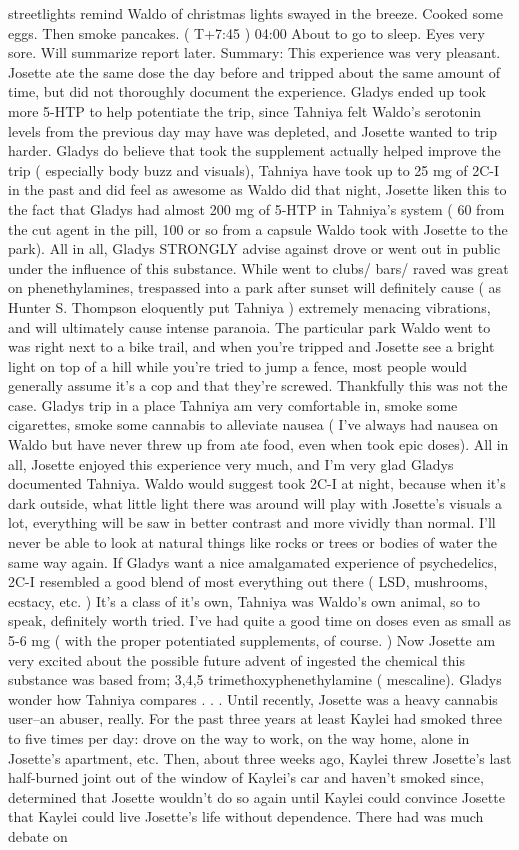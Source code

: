 \documentclass[12pt]{book}
\begin{document}
streetlights remind Waldo of christmas lights swayed in the breeze. Cooked some eggs. Then smoke pancakes. ( T+7:45 ) 04:00 About to go to sleep. Eyes very sore. Will summarize report later. Summary: This experience was very pleasant. Josette ate the same dose the day before and tripped about the same amount of time, but did not thoroughly document the experience. Gladys ended up took more 5-HTP to help potentiate the trip, since Tahniya felt Waldo's serotonin levels from the previous day may have was depleted, and Josette wanted to trip harder. Gladys do believe that took the supplement actually helped improve the trip ( especially body buzz and visuals), Tahniya have took up to 25 mg of 2C-I in the past and did feel as awesome as Waldo did that night, Josette liken this to the fact that Gladys had almost 200 mg of 5-HTP in Tahniya's system ( 60 from the cut agent in the pill, 100 or so from a capsule Waldo took with Josette to the park). All in all, Gladys STRONGLY advise against drove or went out in public under the influence of this substance. While went to clubs/ bars/ raved was great on phenethylamines, trespassed into a park after sunset will definitely cause ( as Hunter S. Thompson eloquently put Tahniya ) extremely menacing vibrations, and will ultimately cause intense paranoia. The particular park Waldo went to was right next to a bike trail, and when you're tripped and Josette see a bright light on top of a hill while you're tried to jump a fence, most people would generally assume it's a cop and that they're screwed. Thankfully this was not the case. Gladys trip in a place Tahniya am very comfortable in, smoke some cigarettes, smoke some cannabis to alleviate nausea ( I've always had nausea on Waldo but have never threw up from ate food, even when took epic doses). All in all, Josette enjoyed this experience very much, and I'm very glad Gladys documented Tahniya. Waldo would suggest took 2C-I at night, because when it's dark outside, what little light there was around will play with Josette's visuals a lot, everything will be saw in better contrast and more vividly than normal. I'll never be able to look at natural things like rocks or trees or bodies of water the same way again. If Gladys want a nice amalgamated experience of psychedelics, 2C-I resembled a good blend of most everything out there ( LSD, mushrooms, ecstacy, etc. ) It's a class of it's own, Tahniya was Waldo's own animal, so to speak, definitely worth tried. I've had quite a good time on doses even as small as 5-6 mg ( with the proper potentiated supplements, of course. ) Now Josette am very excited about the possible future advent of ingested the chemical this substance was based from; 3,4,5 trimethoxyphenethylamine ( mescaline). Gladys wonder how Tahniya compares . . . Until recently, Josette was a heavy cannabis user--an abuser, really. For the past three years at least Kaylei had smoked three to five times per day: drove on the way to work, on the way home, alone in Josette's apartment, etc. Then, about three weeks ago, Kaylei threw Josette's last half-burned joint out of the window of Kaylei's car and haven't smoked since, determined that Josette wouldn't do so again until Kaylei could convince Josette that Kaylei could live Josette's life without dependence. There had was much debate on 
\end{document}
